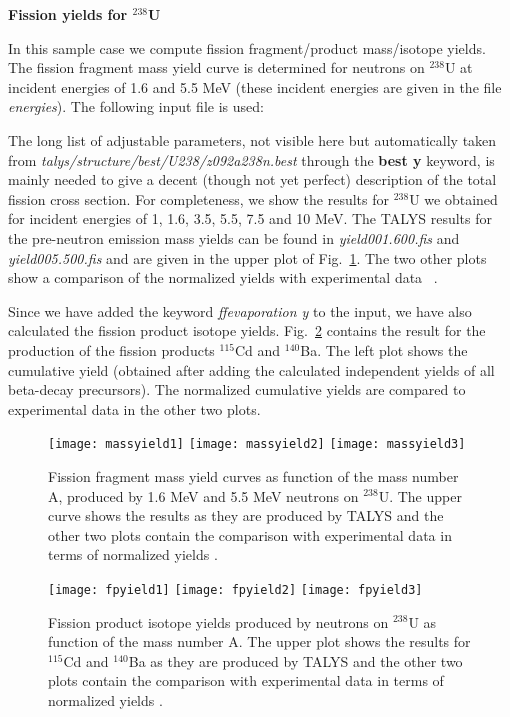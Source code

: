 \begin{samplecase}
{\bf Fission yields for ${}^{238}$U}\newline

In this sample case we compute fission fragment/product mass/isotope yields.
The fission fragment mass yield curve is determined for neutrons on $^{238}$U 
at incident energies of 1.6 and 5.5 MeV (these incident energies are given 
in the file {\em energies}). The following input file is used:


The long list of adjustable parameters, not visible here but automatically 
taken from 
{\em talys/structure/best/U238/z092a238n.best} through the {\bf best y} keyword,
is mainly needed to give a decent (though not yet perfect) description of the 
total fission cross section.
For completeness, we show the results for ${}^{238}$U we obtained 
for incident energies of 1, 1.6, 3.5, 5.5, 7.5 and 10 MeV.
The TALYS results for the pre-neutron emission mass yields can be found in
{\em yield001.600.fis} and {\em yield005.500.fis} and are given in the
upper plot of Fig.~\ref{u238mass}.
The two other plots show a comparison of the normalized yields with
experimental data ~\cite{Vives2000}.

Since we have added the keyword {\em ffevaporation y} to the input,
we have also calculated the fission product isotope yields.
Fig.~\ref{u238iso} contains the result for the production of the fission
products $^{115}$Cd and $^{140}$Ba. The left plot shows the cumulative
yield (obtained after adding the calculated independent yields of all
beta-decay precursors). The normalized cumulative yields are compared to
experimental data \cite{Nagy1978,Chapman1978} in the other two plots.
\end{samplecase}
\begin{figure}
\centering\texttt{[image: massyield1]}
\centering\texttt{[image: massyield2]}
\centering\texttt{[image: massyield3]}
\caption{Fission fragment mass yield curves as function of the mass number A,
produced by 1.6 MeV and
5.5 MeV neutrons on ${}^{238}$U. The upper curve shows the results as they
are produced by TALYS and the other two plots contain the comparison with
experimental data in terms of normalized yields \protect\cite{Vives2000}.}
\label{u238mass}
\end{figure}
\begin{figure}
\centering\texttt{[image: fpyield1]}
\centering\texttt{[image: fpyield2]}
\centering\texttt{[image: fpyield3]}
\caption{Fission product isotope yields produced by neutrons on $^{238}$U
as function of the mass number A.
The upper plot shows the results for $^{115}$Cd and $^{140}$Ba as they
are produced by TALYS and the other two plots contain the comparison with
experimental data in terms of normalized yields \protect\cite{Nagy1978,Chapman1978}.}
\label{u238iso}
\end{figure}

